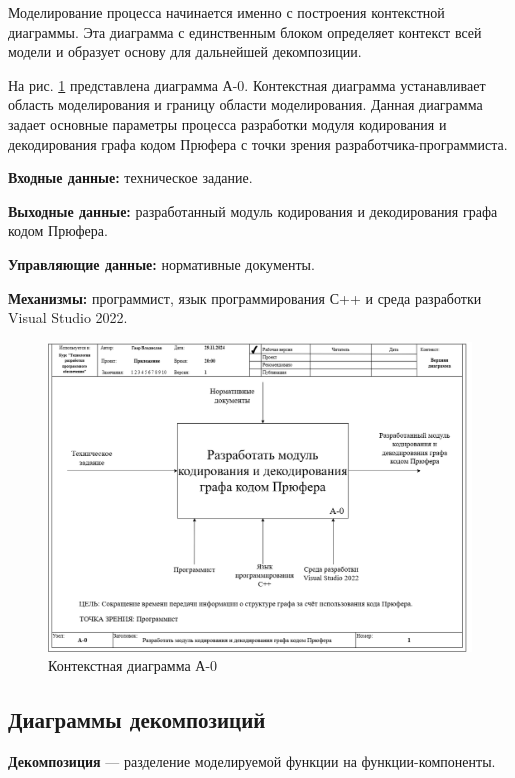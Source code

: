 \documentclass[a4paper, final]{article}
\begin{document}
Моделирование процесса начинается именно с построения контекстной диаграммы. Эта диаграмма с единственным блоком определяет
контекст всей модели и образует основу для дальнейшей декомпозиции. 
\par На рис. \ref{img:A-0} представлена диаграмма А-0. Контекстная диаграмма устанавливает область моделирования и границу 
области моделирования. Данная диаграмма задает основные параметры процесса разработки модуля кодирования и декодирования графа
кодом Прюфера с точки зрения разработчика-программиста. 

\par {\bf Входные данные:} техническое задание.

\par {\bf Выходные данные:} разработанный модуль кодирования и декодирования графа кодом Прюфера.

\par {\bf Управляющие данные:} нормативные документы.

\par {\bf Механизмы:} программист, язык программирования С++ и среда разработки Visual Studio 2022. 

\newpage
\begin{figure}[H]
	\centering
	\includegraphics[width=\linewidth]{A-0.png}
	\caption{Контекстная диаграмма А-0}
	\label{img:A-0}
\end{figure}


\subsection{Диаграммы декомпозиций}
{\bf Декомпозиция} ---  разделение моделируемой функции на функции-компоненты.
\end{document}
